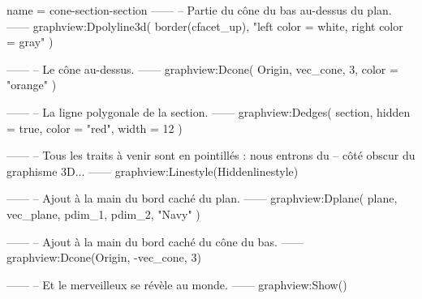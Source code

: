 \documentclass[border = 3pt]{standalone}
\begin{document}
\begin{luadraw}{name = cone-section-section}
------
-- Partie du cône du bas au-dessus du plan.
------
graphview:Dpolyline3d(
  border(cfacet_up),
  "left color = white, right color = gray"
)

------
-- Le cône au-dessus.
------
graphview:Dcone(
  Origin, vec_cone, 3,
  {
    color = "orange"
  })

------
-- La ligne polygonale de la section.
------
graphview:Dedges(
  section,
  {
    hidden = true, color = "red", width = 12
  })

------
-- Tous les traits à venir sont en pointillés : nous entrons du
-- côté obscur du graphisme 3D...
------
graphview:Linestyle(Hiddenlinestyle)

------
-- Ajout à la main du bord caché du plan.
------
graphview:Dplane(
  plane,
  vec_plane, pdim_1, pdim_2,
  "Navy"
)

------
-- Ajout à la main du bord caché du cône du bas.
------
graphview:Dcone(Origin, -vec_cone, 3)

------
-- Et le merveilleux se révèle au monde.
------
graphview:Show()
\end{luadraw}
\end{document}
